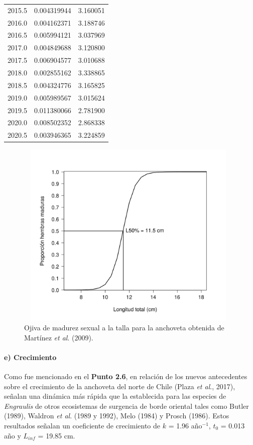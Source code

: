 \documentclass[letter,11pt]{article}
\begin{document}
\begin{table}[htb!]
\begin{tabular}{ccc}
 2015.5 & 0.004319944 & 3.160051 \\
 2016.0 & 0.004162371 & 3.188746 \\
 2016.5 & 0.005994121 & 3.037969 \\
 2017.0 & 0.004849688 & 3.120800 \\
 2017.5 & 0.006904577 & 3.010688 \\
 2018.0 & 0.002855162 & 3.338865 \\
 2018.5 & 0.004324776 & 3.165825 \\
 2019.0 & 0.005989567 & 3.015624 \\
 2019.5 & 0.011380066 & 2.781900 \\
 2020.0 & 0.008502352 & 2.868338 \\
 2020.5 & 0.003946365 & 3.224859 \\
 \hline
 \end{tabular}
\end{table}

\vspace{0.5cm}
\begin{figure}[htb!]
 \centering
 \includegraphics[width=11cm,height=9cm]{Figuras/figura16.pdf}
 \caption{Ojiva de madurez sexual a la talla para la anchoveta obtenida de Mart\'inez \textit{et al}. (2009).}
 \label{Fig16}
\end{figure}


\paragraph{e) Crecimiento}

\quad

Como fue mencionado en el \textbf{Punto 2.6}, en relaci\'on de los nuevos
antecedentes sobre el crecimiento de la anchoveta del norte de Chile
(Plaza \textit{et al}., 2017), se\~{n}alan una din\'amica m\'as r\'apida que la
establecida para las especies de \textit{Engraulis} de otros ecosistemas
de surgencia de borde oriental tales como Butler (1989), Waldron
\textit{et al}. (1989 y 1992), Melo (1984) y Prosch (1986). Estos
resultados se\~{n}alan un coeficiente de crecimiento de $k$ = 1.96
a\~{n}o$^{-1}$, $t_0$ = 0.013 a\~{n}o y $L_{inf}$ = 19.85 cm.
\vspace{0.5cm}
\end{document}
